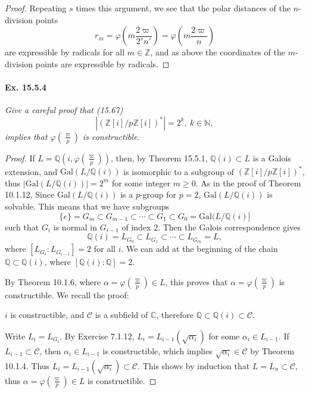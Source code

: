 \documentclass[11pt,a4paper]{article}
\newcommand{\Q}{\mathbb{Q}}
\newcommand{\Z}{\mathbb{Z}}
\newcommand{\N}{\mathbb{N}}
\newcommand{\C}{\mathbb{C}}
\newcommand{\Gal}{\mathrm{Gal}}
\begin{document}
\begin{proof}
Repeating $s$ times this argument, we see that the polar distances of the $n$-division points
$$r_m = \varphi\left( m \frac{2\varpi}{2^sn'} \right) = \varphi\left( m \frac{2\varpi}{n} \right)$$
are expressible by radicals for all $m\in \Z$, and as above the coordinates of the $m$-division points are expressible by radicals.
\end{proof}

\paragraph{Ex. 15.5.4}{\it Give a careful proof that (15.67) 
$$
\left|  \left( \Z[i]/p\Z[i]\right)^*\right| = 2^k,\ k \in \N,
$$
implies that $\varphi\left( \frac{\varpi}{p}\right)$ is constructible.
}
\begin{proof} 
If $L = \Q\left(i, \varphi\left(\frac{\varpi}{p}\right) \right)$, then, by Theorem 15.5.1, $\Q(i) \subset L$ is a Galois extension, and $\Gal(L/\Q(i))$ is isomorphic to a subgroup of $\left(\Z[i]/p\Z[i]\right)^*$, thus $\left|\Gal(L/\Q(i))\right| = 2^m$ for some integer $m\geq 0$. As in the proof of Theorem 10.1.12, Since $\Gal(L/\Q(i))$ is a $p$-group for $p=2$, $\Gal(L/\Q(i))$ is solvable. This means that we have subgroups
$$\{e\} =G_m \subset G_{m-1} \subset\cdots \subset G_1 \subset G_0 = \Gal(L/\Q(i)]$$
such that $G_i$ is normal in $G_{i-1}$ of index $2$. Then the Galois correspondence gives
$$\Q(i) = L_{G_0} \subset L_{G_1} \subset \cdots \subset L_{G_m} = L,$$
where $[L_{G_i} : L_{G_{i-1}}] = 2$ for all $i$. We can add at the beginning of the chain $\Q \subset \Q(i)$, where $[\Q(i) : \Q] = 2$.

By Theorem 10.1.6, where $\alpha = \varphi\left( \frac{\varpi}{p}\right) \in L$, this proves that $\alpha = \varphi\left( \frac{\varpi}{p}\right)$ is constructible. We recall the proof:

$i$ is constructible, and $\mathscr C$ is a subfield of $\C$, therefore $\Q \subset \Q(i) \subset \mathscr{C}$.

Write $L_i = L_{G_i}$. By Exercise 7.1.12, $L_i = L_{i-1}(\sqrt{\alpha_i})$ for some $\alpha_i \in L_{i-1}$. If $L_{i-1} \subset \mathscr C$, then $\alpha_i \in L_{i-1}$ is constructible, which implies $\sqrt{\alpha_i} \in {\mathscr C}$ by Theorem 10.1.4. Thus $L_i = L_{i-1}(\sqrt{\alpha_i}) \subset \mathscr C$. This shows by induction that $L = L_n \subset \mathscr C$, thus $\alpha = \varphi\left( \frac{\varpi}{p}\right) \in L$ is constructible.
\end{proof}
\end{document}
